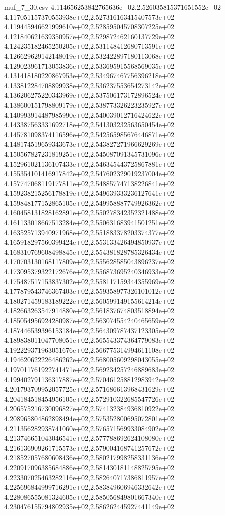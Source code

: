 \begin{filecontents*}{muf_7_30.csv}
4.114656253842765636e+02,2.526035815371651552e+02
4.117051157370553938e+02,2.527316163415407573e+02
4.119445946621999610e+02,2.528595045708307225e+02
4.121840621639350957e+02,2.529872462160137729e+02
4.124235182465250205e+02,2.531148412680713591e+02
4.126629629142148019e+02,2.532422897180113068e+02
4.129023961713053836e+02,2.533695915568569035e+02
4.131418180220867953e+02,2.534967467756396218e+02
4.133812284708899938e+02,2.536237553654273142e+02
4.136206275220343969e+02,2.537506173172896524e+02
4.138600151798809179e+02,2.538773326223235927e+02
4.140993914487985990e+02,2.540039012716424622e+02
4.143387563331692718e+02,2.541303232563650454e+02
4.145781098374116596e+02,2.542565985676446871e+02
4.148174519659343673e+02,2.543827271966629269e+02
4.150567827231819251e+02,2.545087091345731096e+02
4.152961021136107433e+02,2.546345443725867881e+02
4.155354101416917842e+02,2.547602329019237004e+02
4.157747068119177811e+02,2.548857747138226841e+02
4.159238215256178819e+02,2.549639333236127641e+02
4.159848177152865105e+02,2.549958887749926362e+02
4.160458131828162891e+02,2.550278342352321488e+02
4.161133018667513284e+02,2.550631683941501251e+02
4.163525713940971968e+02,2.551883378203374377e+02
4.165918297560399424e+02,2.553133426494850937e+02
4.168310769608498845e+02,2.554381828785326434e+02
4.170703130168117809e+02,2.555628585043896237e+02
4.173095379322172676e+02,2.556873695240346933e+02
4.175487517153837302e+02,2.558117159344355969e+02
4.177879543746367403e+02,2.559358977326101012e+02
4.180271459183189222e+02,2.560599149155614214e+02
4.182663263547914880e+02,2.561837674803518894e+02
4.185054956924280987e+02,2.563074554240465659e+02
4.187446539396153184e+02,2.564309787437123305e+02
4.189838011047708051e+02,2.565543374364779083e+02
4.192229371963051676e+02,2.566775314994611108e+02
4.194620622226486262e+02,2.568005609298043055e+02
4.197011761922741471e+02,2.569234257246889683e+02
4.199402791136317887e+02,2.570461258812983942e+02
4.201793709952057725e+02,2.571686613968431629e+02
4.204184518454956105e+02,2.572910322685547726e+02
4.206575216730096827e+02,2.574132384936810922e+02
4.208965804862898494e+02,2.575352800695072801e+02
4.211356282938741060e+02,2.576571569933084902e+02
4.213746651043046541e+02,2.577788692624108080e+02
4.216136909261715573e+02,2.579004168741257672e+02
4.218527057680608436e+02,2.580217998258331136e+02
4.220917096385684886e+02,2.581430181148825795e+02
4.223307025463282116e+02,2.582640717386811957e+02
4.225696844999716291e+02,2.583849606946332642e+02
4.228086555081324605e+02,2.585056849801667340e+02
4.230476155794802935e+02,2.586262445927441149e+02

\end{filecontents*}
